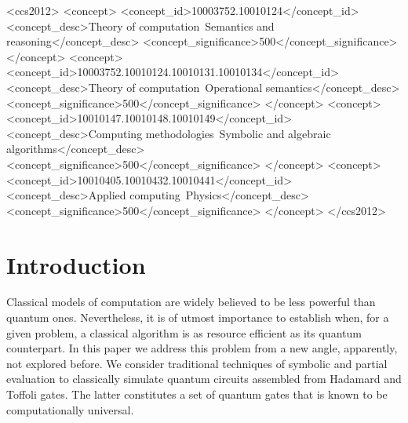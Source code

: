 \documentclass[sigplan,screen]{acmart}
\theoremstyle{definition}
\begin{document}
\begin{CCSXML}
<ccs2012>
   <concept>
       <concept_id>10003752.10010124</concept_id>
       <concept_desc>Theory of computation~Semantics and reasoning</concept_desc>
       <concept_significance>500</concept_significance>
       </concept>
   <concept>
       <concept_id>10003752.10010124.10010131.10010134</concept_id>
       <concept_desc>Theory of computation~Operational semantics</concept_desc>
       <concept_significance>500</concept_significance>
       </concept>
   <concept>
       <concept_id>10010147.10010148.10010149</concept_id>
       <concept_desc>Computing methodologies~Symbolic and algebraic algorithms</concept_desc>
       <concept_significance>500</concept_significance>
       </concept>
   <concept>
       <concept_id>10010405.10010432.10010441</concept_id>
       <concept_desc>Applied computing~Physics</concept_desc>
       <concept_significance>500</concept_significance>
       </concept>
 </ccs2012>
\end{CCSXML}



\maketitle

\section{Introduction}

Classical models of computation are widely believed to be
less powerful than quantum ones. Nevertheless, it is of utmost
importance to establish when, for a given problem,  a classical
algorithm is as resource efficient as its quantum counterpart.
In this paper we address this problem from a new angle, apparently,
not explored before. We consider traditional techniques of
symbolic and partial evaluation to classically simulate quantum
circuits assembled from Hadamard and Toffoli gates. The latter
constitutes a set of quantum gates that is known to be
computationally universal.
\end{document}
